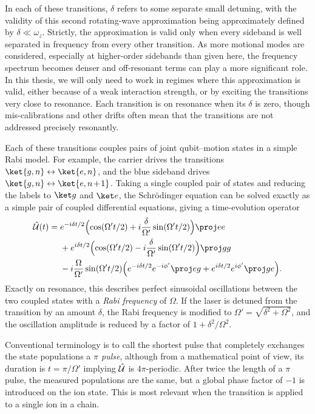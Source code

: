 In each of these transitions, $\delta$ refers to some separate small detuning, with the validity of this second rotating-wave approximation being approximately defined by $\delta\ll\omega_z$.
Strictly, the approximation is valid only when every sideband is well separated in frequency from every other transition.
As more motional modes are considered, especially at higher-order sidebands than given here, the frequency spectrum becomes denser and off-resonant terms can play a more significant role.
In this thesis, we will only need to work in regimes where this approximation is valid, either because of a weak interaction strength, or by exciting the transitions very close to resonance.
Each transition is on resonance when its $\delta$ is zero, though mis-calibrations and other drifts often mean that the transitions are not addressed precisely resonantly.

Each of these transitions couples pairs of joint qubit--motion states in a simple Rabi model.
For example, the carrier drives the transitions $\ket{g,n}\leftrightarrow\ket{e,n}$, and the blue sideband drives $\ket{g,n}\leftrightarrow\ket{e,\msquash{n+1}}$.
Taking a single coupled pair of states and reducing the labels to $\ket g$ and $\ket e$, the Schr\"odinger equation can be solved exactly as a simple pair of coupled differential equations, giving a time-evolution operator
\begin{equation}\label{eq:iontrap-sideband-evolution}\begin{aligned}
\U(t) = {}
    & e^{-i\delta t/2}\Bigl(\cos(\Omega' t/2) + i \frac\delta{\Omega'}\sin(\Omega' t/2)\Bigr)\proj ee\\
    & {} + e^{i\delta t/2}\Bigl(\cos(\Omega' t/2) - i \frac\delta{\Omega'}\sin(\Omega' t/2)\Bigr)\proj gg\\
    & {} - i\frac\Omega{\Omega'}\sin(\Omega' t/2)\Bigl(
        e^{-i\delta t/2}e^{-i\phi'} \proj eg
        + e^{i\delta t/2}e^{i\phi'} \proj ge
    \Bigr).
\end{aligned}\end{equation}
Exactly on resonance, this describes perfect sinusoidal oscillations between the two coupled states with a \emph{Rabi frequency} of $\Omega$.
If the laser is detuned from the transition by an amount $\delta$, the Rabi frequency is modified to $\Omega' = \sqrt{\delta^2 + \Omega^2}$, and the oscillation amplitude is reduced by a factor of $1 + \delta^2/\Omega^2$.

Conventional terminology is to call the shortest pulse that completely exchanges the state populations a \emph{$\pi$ pulse}, although from a mathematical point of view, its duration is $t = \pi/\Omega'$ implying $\hat{\mathcal U}$ is $4\pi$-periodic.
After twice the length of a $\pi$ pulse, the measured populations are the same, but a global phase factor of $-1$ is introduced on the ion state.
This is most relevant when the transition is applied to a single ion in a chain.

